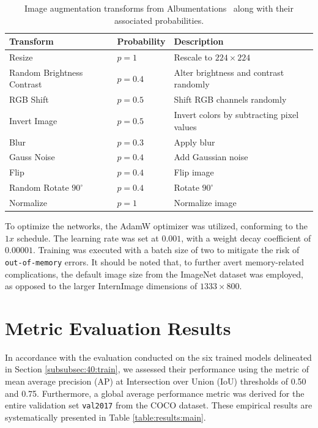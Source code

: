 \begin{table}[!htbp]
\begin{adjustbox}{max width=\textwidth}
\begin{tabular}{|l|l|l|}
\hline
\textbf{Transform} & \textbf{Probability} & \textbf{Description} \\ \hline
Resize & $p=1$ & Rescale to $224 \times 224$\\ \hline
Random Brightness Contrast & $p=0.4$ & Alter brightness and contrast randomly\\ \hline
RGB Shift & $p=0.5$ & Shift RGB channels randomly\\ \hline
Invert Image & $p=0.5$ & Invert colors by subtracting pixel values\\ \hline
Blur & $p=0.3$ & Apply blur\\ \hline
Gauss Noise& $p=0.4$ & Add Gaussian noise\\ \hline
Flip & $p=0.4$ & Flip image\\ \hline
Random Rotate $90^{\circ}$ & $p=0.4$ & Rotate $90^{\circ}$\\ \hline
Normalize & $p=1$ & Normalize image\\ \hline
\end{tabular}
\end{adjustbox}
\caption{Image augmentation transforms from Albumentations~\cite{info11020125} along with their associated probabilities.}
\label{tab:50:augment}
\end{table}

To optimize the networks, the AdamW optimizer \cite{kingma2017adam} was utilized, conforming to the $1x$ schedule. The learning rate was set at $0.001$, with a weight decay coefficient of $0.00001$. Training was executed with a batch size of two to mitigate the risk of \texttt{out-of-memory} errors. It should be noted that, to further avert memory-related complications, the default image size from the ImageNet dataset was employed, as opposed to the larger InternImage dimensions of $1333 \times 800$.

\section{Metric Evaluation Results}
In accordance with the evaluation conducted on the six trained models delineated in Section \ref{subsubsec:40:train}, we assessed their performance using the metric of mean average precision (AP) at Intersection over Union (IoU) thresholds of 0.50 and 0.75. Furthermore, a global average performance metric was derived for the entire validation set \texttt{val2017} from the COCO dataset. These empirical results are systematically presented in Table \ref{table:results:main}.\\

